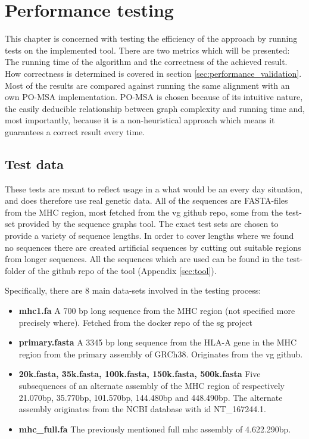 \documentclass[thesis.tex]{subfiles}
\begin{document}
\chapter{Performance testing}
This chapter is concerned with testing the efficiency of the approach by running tests on the implemented tool. There are two metrics which will be presented: The running time of the algorithm and the correctness of the achieved result. How correctness is determined is covered in section \ref{sec:performance_validation}. Most of the results are compared against running the same alignment with an own PO-MSA implementation. PO-MSA is chosen because of its intuitive nature, the easily deducible relationship between graph complexity and running time and, most importantly, because it is a non-heuristical approach which means it guarantees a correct result every time.
\section{Test data}
These tests are meant to reflect usage in a what would be an every day situation, and does therefore use real genetic data. All of the sequences are FASTA-files from the MHC region, most fetched from the vg github repo\cite{vg}, some from the test-set provided by the sequence graphs tool\cite{sequence_graphs}. The exact test sets are chosen to provide a variety of sequence lengths. In order to cover lengths where we found no sequences there are created artificial sequences by cutting out suitable regions from longer sequences. All the sequences which are used can be found in the test-folder of the github repo of the tool (Appendix \ref{sec:tool}).\\
\par\noindent
Specifically, there are 8 main data-sets involved in the testing process:
\begin{itemize}
  \item \textbf{mhc1.fa} A 700 bp long sequence from the MHC region (not specified more precisely where). Fetched from the docker repo of the sg project
  \item \textbf{primary.fasta} A 3345 bp long sequence from the HLA-A gene in the MHC region from the primary assembly of GRCh38. Originates from the vg github.
  \item \textbf{20k.fasta, 35k.fasta, 100k.fasta, 150k.fasta, 500k.fasta} Five subsequences of an alternate assembly of the MHC region of respectively 21.070bp, 35.770bp, 101.570bp, 144.480bp and 448.490bp. The alternate assembly originates from the NCBI database\cite{ncbi} with id NT\_167244.1.
  \item \textbf{mhc\_full.fa} The previously mentioned full mhc assembly of 4.622.290bp.
\end{itemize}
\end{document}
